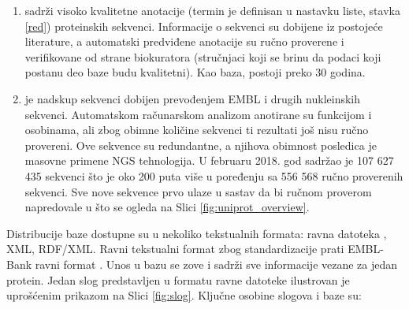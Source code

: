 \begin{enumerate}
  \item \keyword{\swissprot}  sadrži visoko kvalitetne anotacije
     (termin je definisan u nastavku liste,
    stavka \ref{red}) proteinskih sekvenci.  Informacije o sekvenci su dobijene
    iz postojeće literature, a automatski predviđene anotacije su ručno
    proverene i verifikovane od strane biokuratora (stručnjaci koji se brinu da
    podaci koji postanu deo baze \swissprot budu kvalitetni).  Kao baza, \swissprot 
    postoji preko 30 godina.

  \item \trembl {} je nadskup \swissprot sekvenci 
    dobijen prevođenjem EMBL i drugih nukleinskih sekvenci. Automatskom
    računarskom analizom anotirane su funkcijom i osobinama, ali zbog obimne
    količine sekvenci ti rezultati još nisu ručno provereni.  Ove sekvence su
    redundantne, a njihova obimnost posledica je masovne primene NGS
    tehnologija. U februaru 2018. god \trembl sadržao je 107 627 435 sekvenci
    što je oko 200 puta više u poređenju sa 556 568 ručno proverenih \swissprot
    sekvenci. Sve nove sekvence prvo ulaze u sastav \trembl da bi ručnom
    proverom napredovale u \swissprot što se ogleda na Slici
    \ref{fig:uniprot_overview}.
\end{enumerate}





Distribucije baze \swissprot dostupne su u nekoliko tekstualnih formata: ravna
datoteka , XML, RDF/XML.  Ravni tekstualni format zbog
standardizacije prati EMBL-Bank ravni format \parencite{svisprot2003}.
Unos u bazu se zove   i sadrži sve informacije vezane
za jedan protein.  Jedan slog predstavljen u formatu ravne datoteke ilustrovan
je uprošćenim prikazom  na Slici \ref{fig:slog}.  Ključne osobine slogova i
baze \swissprot su:


